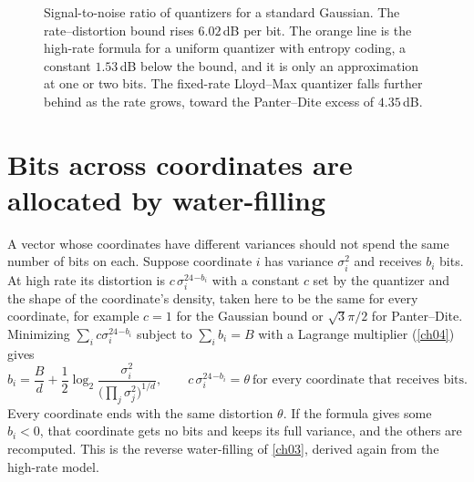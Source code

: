 \begin{figure}[tbp]\centering
{}
\caption{Signal-to-noise ratio of quantizers for a standard Gaussian. The rate--distortion bound rises $6.02$\,dB per bit. The orange line is the high-rate formula for a uniform quantizer with entropy coding, a constant $1.53$\,dB below the bound, and it is only an approximation at one or two bits. The fixed-rate Lloyd--Max quantizer falls further behind as the rate grows, toward the Panter--Dite excess of $4.35$\,dB.}
\label{fig:ch07:snr}
\end{figure}


\section{Bits across coordinates are allocated by water-filling}\label{sec:ch07:alloc}

A vector whose coordinates have different variances should not spend the same number of bits on each. Suppose coordinate $i$ has variance $\sigma_i^2$ and receives $b_i$ bits. At high rate its distortion is $c\,\sigma_i^24^{-b_i}$ with a constant $c$ set by the quantizer and the shape of the coordinate's density, taken here to be the same for every coordinate, for example $c=1$ for the Gaussian bound or $\sqrt3\pi/2$ for Panter--Dite. Minimizing $\sum_ic\sigma_i^24^{-b_i}$ subject to $\sum_ib_i=B$ with a Lagrange multiplier (\cref{ch04}) gives
\begin{equation}\label{eq:ch07:alloc}
b_i=\frac Bd+\frac12\log_2\frac{\sigma_i^2}{\big(\prod_j\sigma_j^2\big)^{1/d}},\qquad
c\,\sigma_i^24^{-b_i}=\theta\ \text{for every coordinate that receives bits}.
\end{equation}
Every coordinate ends with the same distortion $\theta$. If the formula gives some $b_i<0$, that coordinate gets no bits and keeps its full variance, and the others are recomputed. This is the reverse water-filling of \cref{ch03}, derived again from the high-rate model.

